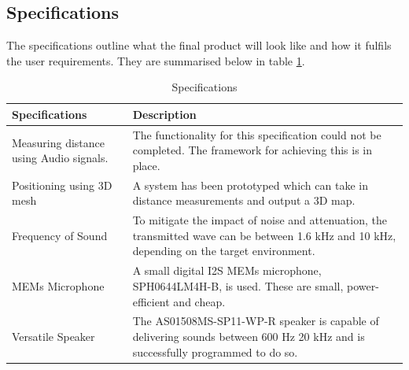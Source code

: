 \subsection{Specifications}

The specifications outline what the final product will look like and how it fulfils the user requirements. They are summarised below in table \ref{tab:specifications}.
\begin{center}
    \begin{table}[H]
    \captionsetup{singlelinecheck = false, format= hang, justification=raggedright, font=footnotesize, labelsep=space}
    \caption{Specifications}
    \begin{adjustbox}{max width=\textwidth}
    \begin{tabular}{p{5.24cm}p{11.25cm}}
    \hline
    \multicolumn{1}{|p{5.24cm}}{Specifications} & 
    \multicolumn{1}{|p{11.25cm}|}{Description} \\ 
    \hline
    \multicolumn{1}{|p{5.24cm}}{Measuring distance using Audio signals. } & 
    \multicolumn{1}{|p{11.25cm}|}{The functionality for this specification could not be completed. The framework for achieving this is in place.} \\ 
    \hline
    \multicolumn{1}{|p{5.24cm}}{Positioning using 3D mesh } & 
    \multicolumn{1}{|p{11.25cm}|}{A system has been prototyped which can take in distance measurements and output a 3D map.} \\ 
    \hline
    \multicolumn{1}{|p{5.24cm}}{Frequency of Sound} & 
    \multicolumn{1}{|p{11.25cm}|}{To mitigate the impact of noise and attenuation, the transmitted wave can be between 1.6 kHz and 10 kHz, depending on the target environment.} \\ 
    \hline
    \multicolumn{1}{|p{5.24cm}}{MEMs Microphone } & 
    \multicolumn{1}{|p{11.25cm}|}{A small digital I2S MEMs microphone, SPH0644LM4H-B, is used. These are small, power-efficient and cheap.} \\ 
    \hline
    \multicolumn{1}{|p{5.24cm}}{Versatile Speaker} & 
    \multicolumn{1}{|p{11.25cm}|}{The AS01508MS-SP11-WP-R speaker is capable of delivering sounds between 600 Hz 20 kHz and is successfully programmed to do so.} \\ 
    \hline
    \end{tabular}
    \end{adjustbox}
    \label{tab:specifications}\end{table}
\end{center}

